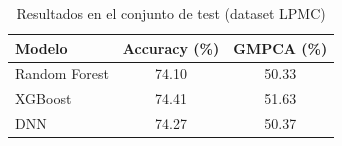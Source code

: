 \begin{table}[htbp]
\caption{Resultados en el conjunto de test (dataset LPMC)}
\label{tab:lpmc_test_results}
\centering
\begin{tabular}{lcc}
\toprule
Modelo & Accuracy (\%) & GMPCA (\%) \\
\midrule
Random Forest & 74.10 & 50.33 \\
XGBoost & 74.41 & 51.63 \\
DNN & 74.27 & 50.37 \\
\bottomrule
\end{tabular}
\end{table}